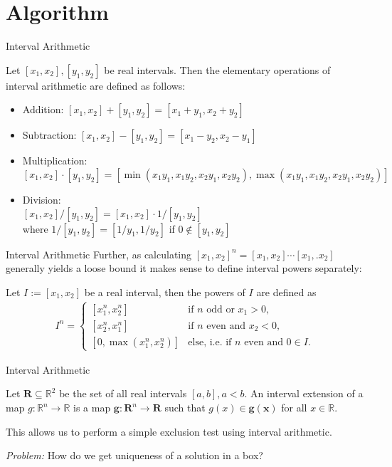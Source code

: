 \documentclass[german,10pt,xcolor=colortbl,compress]{beamer}
\begin{document}
\section{Algorithm}
\begin{frame}{Interval Arithmetic}
    \begin{definition}
    Let $[x_1,x_2], [y_1,y_2]$ be real intervals. Then the elementary operations of interval arithmetic are defined as follows:
        \begin{itemize}
            \item Addition: $[x_1,x_2] + [y_1,y_2] = [x_1+y_1,x_2+y_2]$
            \item Subtraction: $[x_1,x_2] - [y_1,y_2] = [x_1-y_2,x_2-y_1]$
            \item Multiplication: $[x_1,x_2] \cdot [y_1,y_2] = [\min(x_1y_1,x_1y_2,x_2y_1,x_2y_2), \max(x_1y_1,x_1y_2,x_2y_1,x_2y_2)]$
            \item Division: \\ $[x_1,x_2] / [y_1,y_2] = [x_1,x_2] \cdot 1/[y_1,y_2]$ \\where $1/[y_1,y_2]= [1/y_1, 1/y_2]$ if $0 \notin [y_1,y_2] $
        \end{itemize}
    \end{definition}
\end{frame}

\begin{frame}{Interval Arithmetic}
    Further, as calculating $[x_1,x_2]^n = [x_1, x_2] \cdots [x_1,. x_2]$ generally yields a
    loose bound it makes sense to define interval powers separately:
    \begin{definition}
        Let $I := [x_1, x_2]$ be a real interval, then the powers of $I$ are defined
        as
        \begin{align*}
            I^n =
            \begin{cases}
                [x_1^n, x_2^n] & \text{if $n$ odd or $x_1 > 0$,} \\
                [x_2^n, x_1^n] & \text{if $n$ even and $x_2 < 0$,} \\
                [0, \max(x_1^n, x_2^n)] & \text{else, i.e. if $n$ even and $0\in I$.}
            \end{cases}
        \end{align*}
    \end{definition}
\end{frame}

\begin{frame}{Interval Arithmetic}
    \begin{definition}
        Let  $\mathbf{R} \subseteq \mathbb{R}^2$ be the set of all real intervals $[a,b],
        a < b$. An interval extension of a map $g: \mathbb{R}^n \to \mathbb{R}$ is a map
        $\mathbf{g}: \mathbf{R}^n \to \mathbf{R}$ such that $g(x) \in
        \mathbf{g}(\mathbf{x}) $ for all $x \in \mathbb{R}$.
    \end{definition}

    This allows us to perform a simple exclusion test using interval arithmetic.
    \bigskip

    \emph{Problem:} How do we get uniqueness of a solution in a box?
\end{frame}
\end{document}
